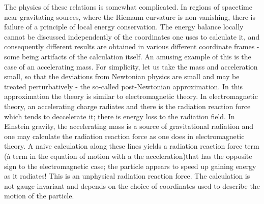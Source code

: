 The physics of these relations is somewhat complicated. In regions of spacetime
near gravitating sources, where the Riemann curvature is non-vanishing,
there is  failure of a principle of local energy conservation. The energy balance locally
cannot be discussed independently of the coordinates one uses to calculate
it, and consequently different results are obtained in various different
coordinate frames - some being artifacts of the calculation itself.
An amusing example of this is the case of an accelerating
mass.  For simplicity, let us take the mass and acceleration small, so that the
deviations from Newtonian physics are small and may be treated perturbatively -
the so-called post-Newtonian approximation.
In this approximation the theory is  similar to electromagnetic theory.  In
electromagnetic theory, an accelerating charge radiates and there is the radiation
reaction force which tends to deccelerate it; there is energy loss to the
radiation field.  In Einstein gravity, the accelerating mass is a source of
gravitational radiation and one may calculate the radiation reaction force as
one does in electromagnetic theory.  A naive calculation along these lines
yields a radiation reaction force term  (\.{a}
term in the equation of motion with a the acceleration)that has the opposite sign to the electromagnetic
case; the particle appears to speed up gaining energy as it
radiates!  This is an unphysical radiation reaction force.
The calculation is not gauge invariant and  depends on the
choice of coordinates used to describe the motion of the particle.

